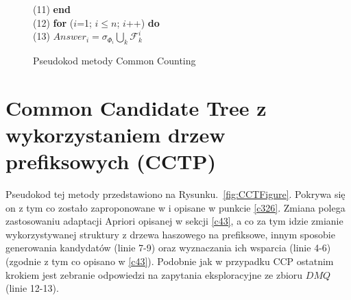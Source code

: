 \begin{figure}[h]
	\hspace*{6em} (11)\hspace{1em} \textbf{end} \\
	\hspace*{6em} (12)\hspace{1em} \textbf{for} ($i$=1; $i \leq n$; $i$++) \textbf{do} \\
	\hspace*{6em} (13)\hspace{2em}    $Answer_i = \sigma_{\Phi_i} \bigcup_k \mathcal{F}_k^i$
	\caption{Pseudokod metody Common Counting}
	\label{fig:CCFigure}
\end{figure}


\section{Common Candidate Tree z wykorzystaniem drzew prefiksowych (CCTP)}
\label{c45}
Pseudokod tej metody przedstawiono na Rysunku.~\ref{fig:CCTFigure}. Pokrywa się on z tym co zostało zaproponowane w \cite{WojciechowskiCCT} i opisane w punkcie \ref{c326}. Zmiana polega zastosowaniu adaptacji Apriori opisanej w sekcji \ref{c43}, a co za tym idzie zmianie wykorzystywanej struktury z drzewa haszowego na prefiksowe, innym sposobie generowania kandydatów (linie 7-9) oraz wyznaczania ich wsparcia (linie 4-6) (zgodnie z tym co opisano w \ref{c43}). Podobnie jak w przypadku CCP ostatnim krokiem jest zebranie odpowiedzi na zapytania eksploracyjne ze zbioru \(DMQ\) (linie 12-13).

